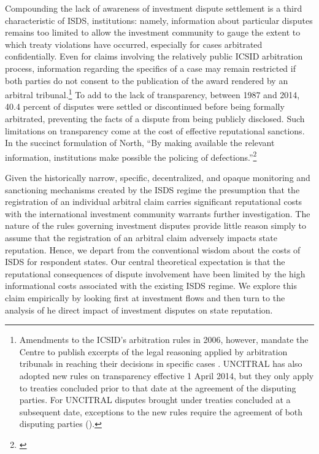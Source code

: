 \documentclass[12pt,onesided]{amsart}
\begin{document}
Compounding the lack of awareness of investment dispute settlement is a third characteristic of ISDS, institutions: namely, information about particular disputes remains too limited to allow the investment community to gauge the extent to which treaty violations have occurred, especially for cases arbitrated confidentially. Even for claims involving the relatively public ICSID arbitration process, information regarding the specifics of a case may remain restricted if both parties do not consent to the publication of the award rendered by an arbitral tribunal.\footnote{Amendments to the ICSID's arbitration rules in 2006, however, mandate the Centre to publish excerpts of the legal reasoning applied by arbitration tribunals in reaching their decisions in specific cases \citep{antonietti:2006}. UNCITRAL has also adopted new rules on transparency effective 1 April 2014, but they only apply to treaties concluded prior to that date at the agreement of the disputing parties. For UNCITRAL disputes brought under treaties concluded at a subsequent date, exceptions to the new rules require the agreement of both disputing parties (\citealp[p. 33--40]{uncitral:2013}).} To add to the lack of transparency, between 1987 and 2014, 40.4 percent of disputes were settled or discontinued before being formally arbitrated, preventing the facts of a dispute from being publicly disclosed. Such limitations on transparency come at the cost of effective reputational sanctions. In the succinct formulation of North, ``By making available the relevant information, institutions make possible the policing of defections.''\footnote{\citet[p. 57]{north1990institutions}} 

Given the historically narrow, specific, decentralized, and opaque monitoring and sanctioning mechanisms created by the ISDS regime the presumption that the registration of an individual arbitral claim carries significant reputational costs with the international investment community warrants further investigation. The nature of the rules governing investment disputes provide little reason simply to assume that the registration of an arbitral claim adversely impacts state reputation. Hence, we depart from the conventional wisdom about the costs of ISDS for respondent states. Our central theoretical expectation is that the reputational consequences of dispute involvement have been limited by the high informational costs associated with the existing ISDS regime. We explore this claim empirically by looking first at investment flows and then turn to the analysis of he direct impact of investment disputes on state reputation. 
\end{document}
